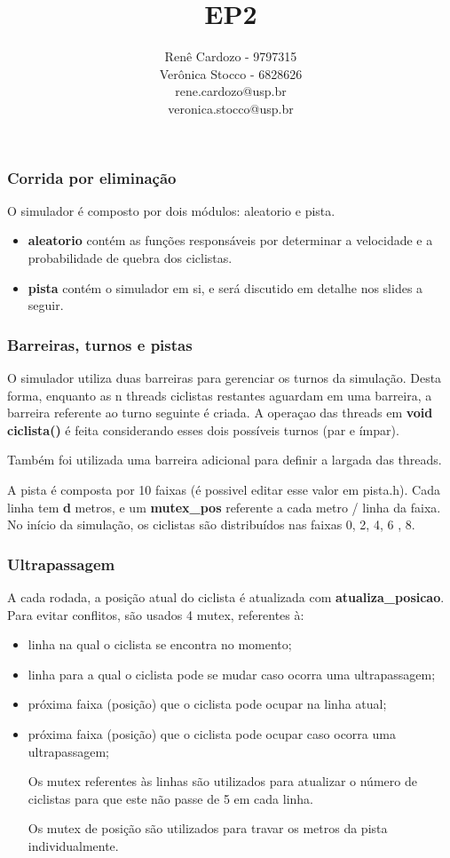 \documentclass{beamer}
\author{Renê Cardozo - 9797315 \\ 
        Verônica Stocco - 6828626 \\
        rene.cardozo@usp.br \\
        veronica.stocco@usp.br}
\title{EP2}
\institute{Instituto de Matemática e Estatística \\
Universidade de São Paulo}
\date{}
\begin{document}
\frame{\titlepage}

\begin{frame}

\frametitle{Corrida por eliminação}

O simulador é composto por dois módulos: aleatorio e pista. 
\begin{itemize}
\item \textbf{aleatorio} contém as funções responsáveis por determinar a velocidade e a probabilidade de quebra dos ciclistas.

\item \textbf{pista} contém o simulador em si, e será discutido em detalhe nos slides a seguir.

\end{itemize}
\end{frame}


\begin{frame}
\frametitle{Barreiras, turnos e pistas}

O simulador utiliza duas barreiras para gerenciar os turnos da simulação. Desta forma, enquanto as n threads ciclistas restantes aguardam em uma barreira, a barreira referente ao turno seguinte é criada. A operaçao das threads em \textbf{void ciclista()} é feita considerando esses dois possíveis turnos (par e ímpar).

Também foi utilizada uma barreira adicional para definir a largada das threads.

A pista é composta por 10 faixas (é possivel editar esse valor em pista.h). Cada linha tem \textbf{d} metros, e um
    \textbf{mutex\_pos} referente a cada metro / linha da faixa.  No início da simulação, os ciclistas são distribuídos
    nas faixas 0, 2, 4, 6 , 8.

\end{frame}



\begin{frame}
\frametitle{Ultrapassagem}

A cada rodada, a posição atual do ciclista é atualizada com \textbf{atualiza\_posicao}. Para evitar conflitos, são usados 4 mutex, referentes à:

\begin{itemize}
\item linha na qual o ciclista se encontra no momento;
\item linha para a qual o ciclista pode se mudar caso ocorra uma ultrapassagem;
\item próxima faixa (posição) que o ciclista pode ocupar na linha atual;
\item próxima faixa (posição) que o ciclista pode ocupar caso ocorra uma ultrapassagem;

Os mutex referentes às linhas são utilizados para atualizar o número de ciclistas para que este não passe de 5 em cada
        linha.

Os mutex de posição são utilizados para travar os metros da pista individualmente.
\end{itemize}

\end{frame}
\end{document}
